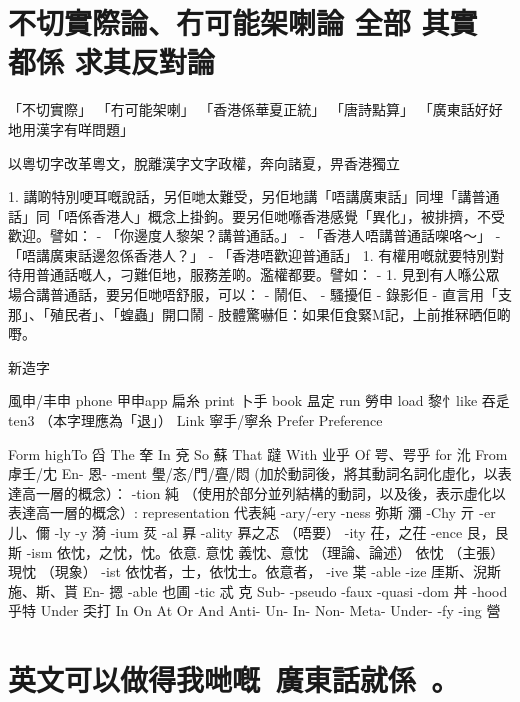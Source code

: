 \section{不切實際論、冇可能架喇論 全部 其實 都係 求其反對論}
「不切實際」
「冇可能架喇」
「香港係華夏正統」
「唐詩點算」
「廣東話好好地用漢字有咩問題」


以粵切字改革粵文，脫離漢字文字政權，奔向諸夏，畀香港獨立





1. 講啲特別哽耳嘅說話，另佢哋太難受，另佢地講「唔講廣東話」同埋「講普通話」同「唔係香港人」概念上掛鉤。要另佢哋喺香港感覺「異化」，被排擠，不受歡迎。譬如：
- 「你邊度人黎架？講普通話。」
- 「香港人唔講普通話㗎咯～」
- 「唔講廣東話邊忽係香港人？」
- 「香港唔歡迎普通話」
1. 有權用嘅就要特別對待用普通話嘅人，刁難佢地，服務差啲。濫權都要。譬如：
-
1. 見到有人喺公眾場合講普通話，要另佢哋唔舒服，可以：
- 鬧佢、
- 騷擾佢
- 錄影佢
- 直言用「支那」、「殖民者」、「蝗蟲」開口鬧
- 肢體驚嚇佢：如果佢食緊M記，上前推冧晒佢啲嘢。





新造字

風申/丰申 phone
甲申app
扁糸 print
卜手 book
昷定 run
勞申 load
黎忄like
吞辵 ten3 （本字理應為「退」）
Link 寧手/寧糸
Prefer
Preference

Form
highTo 舀
The 羍
In 兗
So 蘇
That 躂
With 业乎
Of 咢、咢乎
for 沎
From 虖壬/冘
En- 恩-
-ment 璺/忞/門/亹/悶 (加於動詞後，將其動詞名詞化虛化，以表達高一層的概念）：
-tion 純 （使用於部分並列結構的動詞，以及後，表示虛化以表達高一層的概念）: representation 代表純
-ary/-ery
-ness 弥斯 瀰
-Chy 亓
-er 儿、儞
-ly
-y 漪
-ium 烎
-al 奡
-ality 奡之忑 （唔要）
-ity 茌，之茌
-ence 艮，艮斯
-ism 依忱，之忱，忱。依意. 意忱
義忱、意忱  （理論、論述）
依忱  （主張）
現忱  （現象）
-ist 依忱者，士，依忱士。依意者，
-ive 枼
-able
-ize 厓斯、淣斯 施、斯、貰
En- 摁
-able 也圃
-tic 忒 克
Sub-
-pseudo
-faux
-quasi
-dom 丼
-hood 乎特
Under 奀打
In
On
At
Or
And
Anti-
Un-
In-
Non-
Meta-
Under-
-fy
-ing 營








\section{英文可以做得我哋嘅，廣東話就係。}






